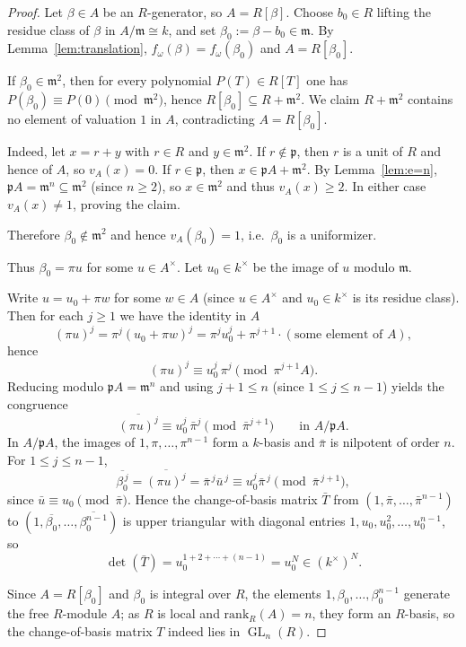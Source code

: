 \documentclass[11pt,letterpaper]{amsart}
\newcommand{\GL}{\operatorname{GL}}
\theoremstyle{plain}
\theoremstyle{definition}
\theoremstyle{remark}
\theoremstyle{plain}
\begin{document}
\begin{proof}
Let $\beta\in A$ be an $R$-generator, so $A=R[\beta]$.
Choose $b_0\in R$ lifting the residue class of $\beta$ in $A/\mathfrak m\cong k$, and set $\beta_0:=\beta-b_0\in\mathfrak m$.
By Lemma~\ref{lem:translation}, $f_\omega(\beta)=f_\omega(\beta_0)$ and $A=R[\beta_0]$.


If $\beta_0\in \mathfrak m^2$, then for every polynomial $P(T)\in R[T]$ one has
$P(\beta_0)\equiv P(0)\pmod{\mathfrak m^2}$, hence $R[\beta_0]\subseteq R+\mathfrak m^2$.
We claim $R+\mathfrak m^2$ contains no element of valuation $1$ in $A$, contradicting $A=R[\beta_0]$.

Indeed, let $x=r+y$ with $r\in R$ and $y\in \mathfrak m^2$.
If $r\notin\mathfrak p$, then $r$ is a unit of $R$ and hence of $A$, so $v_A(x)=0$.
If $r\in\mathfrak p$, then $x\in \mathfrak pA+\mathfrak m^2$.
By Lemma~\ref{lem:e=n}, $\mathfrak pA=\mathfrak m^n\subseteq\mathfrak m^2$ (since $n\ge 2$),
so $x\in\mathfrak m^2$ and thus $v_A(x)\ge 2$.
In either case $v_A(x)\neq 1$, proving the claim.

Therefore $\beta_0\notin \mathfrak m^2$ and hence $v_A(\beta_0)=1$, i.e.\ $\beta_0$ is a uniformizer.

Thus $\beta_0=\pi u$ for some $u\in A^\times$.
Let $u_0\in k^\times$ be the image of $u$ modulo $\mathfrak m$.


Write $u=u_0+\pi w$ for some $w\in A$ (since $u\in A^\times$ and $u_0\in k^\times$ is its residue class).
Then for each $j\ge 1$ we have the identity in $A$
\[
(\pi u)^j=\pi^j(u_0+\pi w)^j=\pi^j u_0^j+\pi^{j+1}\cdot(\text{some element of }A),
\]
hence
\[
(\pi u)^j \equiv u_0^j\,\pi^j \pmod{\pi^{j+1}A}.
\]
Reducing modulo $\mathfrak pA=\mathfrak m^n$ and using $j+1\le n$ (since $1\le j\le n-1$) yields the
congruence
\[
\overline{(\pi u)^j}\equiv u_0^j\,\bar\pi^j \pmod{\bar\pi^{j+1}}
\qquad\text{in }A/\mathfrak pA.
\]
In $A/\mathfrak pA$, the images of $1,\pi,\dots,\pi^{n-1}$ form a $k$-basis and $\bar\pi$ is nilpotent of order $n$.
For $1\le j\le n-1$,
\[
\overline{\beta_0^{\,j}}
=\overline{(\pi u)^j}
=\bar\pi^{\,j}\bar u^{\,j}
\equiv u_0^j \bar\pi^{\,j}\pmod{\bar\pi^{\,j+1}},
\]
since $\bar u\equiv u_0\pmod{\bar\pi}$.
Hence the change-of-basis matrix $\bar T$ from $(1,\bar\pi,\dots,\bar\pi^{n-1})$ to
$(1,\overline{\beta_0},\dots,\overline{\beta_0^{n-1}})$ is upper triangular with diagonal entries
$1,u_0,u_0^2,\dots,u_0^{n-1}$, so
\[
\det(\bar T)=u_0^{1+2+\cdots+(n-1)}=u_0^N\in (k^\times)^N.
\]


Since $A=R[\beta_0]$ and $\beta_0$ is integral over $R$, the elements $1,\beta_0,\dots,\beta_0^{n-1}$ generate the free $R$-module $A$; as $R$ is local and $\mathrm{rank}_R(A)=n$, they form an $R$-basis, so the change-of-basis matrix $T$ indeed lies in $\GL_n(R)$.


\end{proof}
\end{document}
